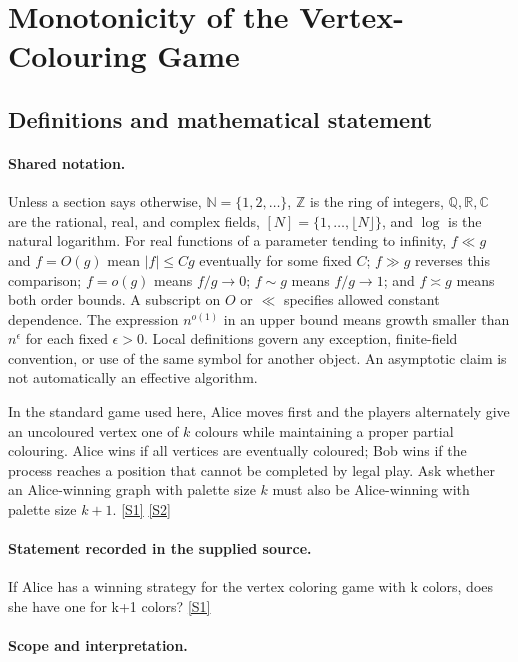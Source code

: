 \documentclass[11pt,a4paper]{article}
\newcommand{\N}{\mathbb{N}}
\newcommand{\Z}{\mathbb{Z}}
\newcommand{\Q}{\mathbb{Q}}
\newcommand{\R}{\mathbb{R}}
\newcommand{\C}{\mathbb{C}}
\newcommand{\sref}[2]{\hyperlink{source:#1:#2}{[S#2]}}
\begin{document}
\section{Monotonicity of the Vertex-Colouring Game}\label{statement}


\subsection{Definitions and mathematical statement}

\paragraph{Shared notation.}Unless a section says otherwise, $\N=\{1,2,\ldots\}$,
$\Z$ is the ring of integers, $\Q,\R,\C$ are the rational, real, and complex
fields, $[N]=\{1,\ldots,\lfloor N\rfloor\}$, and $\log$ is the natural
logarithm. For real functions of a parameter tending to infinity,
$f\ll g$ and $f=O(g)$ mean $|f|\leq Cg$ eventually for some fixed $C$;
$f\gg g$ reverses this comparison; $f=o(g)$ means $f/g\to0$;
$f\sim g$ means $f/g\to1$; and $f\asymp g$ means both order bounds.
A subscript on $O$ or $\ll$ specifies allowed constant dependence.
The expression $n^{o(1)}$ in an upper bound means growth smaller than
$n^\epsilon$ for each fixed $\epsilon>0$. Local definitions govern any
exception, finite-field convention, or use of the same symbol for another
object. An asymptotic claim is not automatically an effective algorithm.



In the standard game used here, Alice moves first and the players alternately give an uncoloured vertex one of $k$ colours while maintaining a proper partial colouring. Alice wins if all vertices are eventually coloured; Bob wins if the process reaches a position that cannot be completed by legal play. Ask whether an Alice-winning graph with palette size $k$ must also be Alice-winning with palette size $k+1$. \sref{statement}{1} \sref{statement}{2}

\paragraph{Statement recorded in the supplied source.}
If Alice has a winning strategy for the vertex coloring game with k colors, does she have one for k+1 colors? \sref{statement}{1}

\paragraph{Scope and interpretation.}
\end{document}
